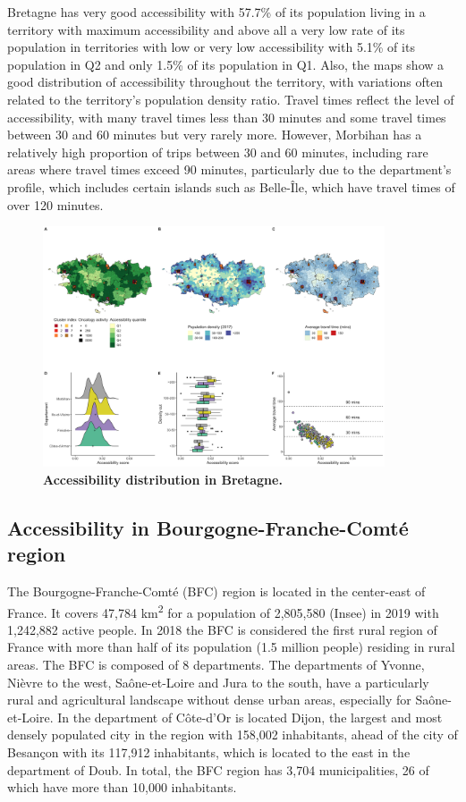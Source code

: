 Bretagne has very good accessibility with 57.7\% of its population living in a
territory with maximum accessibility and above all a very low rate of its
population in territories with low or very low accessibility with 5.1\% of its
population in Q2 and only 1.5\% of its population in Q1. Also, the maps show a
good distribution of accessibility throughout the territory, with variations
often related to the territory's population density ratio. Travel times reflect
the level of accessibility, with many travel times less than 30 minutes and some
travel times between 30 and 60 minutes but very rarely more. However, Morbihan
has a relatively high proportion of trips between 30 and 60 minutes, including
rare areas where travel times exceed 90 minutes, particularly due to the
department's profile, which includes certain islands such as Belle-Île, which
have travel times of over 120 minutes.


\begin{figure}[h!]
    \includegraphics[width=0.9\textwidth]{images/camion/region_accessibility/accessibility_Bretagne.png}
    \centering
    \caption{
        \textbf{Accessibility distribution in Bretagne.}
    }
\end{figure}

\subsection*{Accessibility in Bourgogne-Franche-Comté region}

The Bourgogne-Franche-Comté (BFC) region is located in the center-east of
France. It covers 47,784 km\textsuperscript{2} for a population of 2,805,580
(Insee) in 2019 with 1,242,882 active people. In 2018 the BFC is considered the
first rural region of France with more than half of its population (1.5 million
people) residing in rural areas. The BFC is composed of 8 departments. The
departments of Yvonne, Nièvre to the west, Saône-et-Loire and Jura to the south,
have a particularly rural and agricultural landscape without dense urban areas,
especially for Saône-et-Loire.  In the department of Côte-d'Or is located Dijon,
the largest and most densely populated city in the region with 158,002
inhabitants, ahead of the city of Besançon with its 117,912 inhabitants, which
is located to the east in the department of Doub. In total, the BFC region has
3,704 municipalities, 26 of which have more than 10,000 inhabitants.

